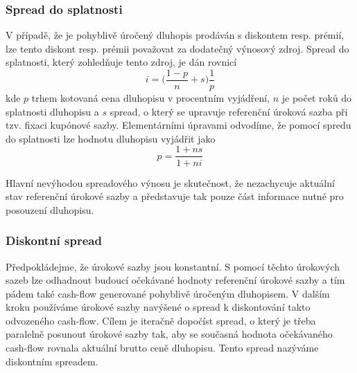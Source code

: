 \documentclass[a4paper]{book}
\begin{document}
\subsubsection{Spread do splatnosti}

V případě, že je pohyblivě úročený dluhopis prodáván s diskontem resp. prémií, lze tento diskont resp. prémii považovat za dodatečný výnosový zdroj. Spread do splatnosti, který zohledňuje tento zdroj, je dán rovnicí
\begin{equation*}
i = \Big(\frac{1 - p}{n} + s \Big) \frac{1}{p}
\end{equation*}
kde $p$ trhem kotovaná cena dluhopisu v procentním vyjádření, $n$ je počet roků do splatnosti dluhopisu a $s$ spread, o který se upravuje referenční úroková sazba při tzv. fixaci kupónové sazby. Elementárními úpravami odvodíme, že pomocí spredu do splatnosti lze hodnotu dluhopisu vyjádřit jako
\begin{equation*}
p = \frac{1 + ns}{1 + ni}
\end{equation*}

Hlavní nevýhodou spreadového výnosu je skutečnost, že nezachycuje aktuální stav referenční úrokové sazby a představuje tak pouze část informace nutné pro posouzení dluhopisu.

\subsubsection{Diskontní spread}

Předpokládejme, že úrokové sazby jsou konstantní. S pomocí těchto úrokových sazeb lze odhadnout budoucí očekávané hodnoty referenční úrokové sazby a tím pádem také cash-flow generované pohyblivě úročeným dluhopisem. V dalším kroku používáme úrokové sazby navýšené o spread k diskontování takto odvozeného cash-flow. Cílem je iteračně dopočíst spread, o který je třeba paralelně posunout úrokové sazby tak, aby se současná hodnota očekávaného cash-flow rovnala aktuální brutto ceně dluhopisu. Tento spread nazýváme diskontním spreadem.
\end{document}
